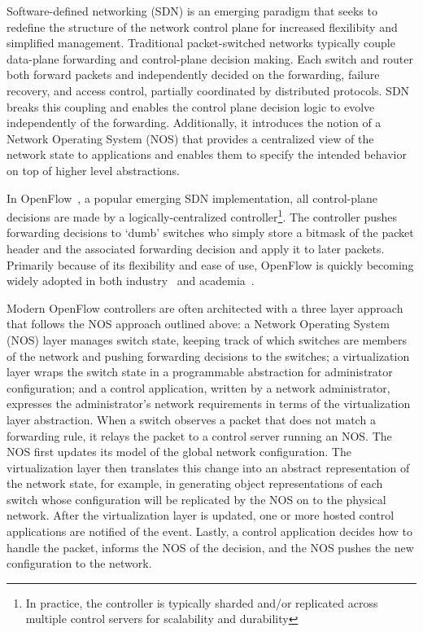 Software-defined networking (SDN) is an emerging paradigm that seeks to redefine
the structure of the network control plane for increased flexilibity and
simplified management. Traditional packet-switched networks typically couple
data-plane forwarding and control-plane decision making. Each switch and router
both forward packets and independently decided on the forwarding, failure
recovery, and access control, partially coordinated by distributed protocols.
SDN breaks this coupling and enables the control plane decision logic to evolve
independently of the forwarding. Additionally, it introduces the notion of a
Network Operating System (NOS) that provides a centralized view of the network
state to applications and enables them to specify the intended behavior on top
of higher level abstractions.

In OpenFlow~\cite{openflow}, a popular emerging SDN implementation, all
control-plane decisions are made by a logically-centralized
controller\footnote{In practice, the controller is typically sharded and/or
replicated across multiple control servers for scalability and durability}. The
controller pushes forwarding decisions to `dumb' switches who simply store a
bitmask of the packet header and the associated forwarding decision and apply it
to later packets. Primarily because of its flexibility and ease of use, OpenFlow
is quickly becoming widely adopted in both industry~\cite{nicirahomepage,
bigswitch} and academia~\cite{nox, pox, ethane}.

Modern OpenFlow controllers are often architected with a three layer approach
that follows the NOS approach outlined above: a Network Operating System (NOS)
layer manages switch state, keeping track of which switches are members of the
network and pushing forwarding decisions to the switches; a virtualization layer
wraps the switch state in a programmable abstraction for administrator
configuration; and a control application, written by a network administrator,
expresses the administrator's network requirements in terms of the
virtualization layer abstraction. When a switch observes a packet that does not
match a forwarding rule, it relays the packet to a control server running an
NOS. The NOS first updates its model of the global network configuration. The
virtualization layer then translates this change into an abstract representation
of the network state, for example, in generating object representations of each
switch whose configuration will be replicated by the NOS on to the physical
network. After the virtualization layer is updated, one or more hosted control
applications are notified of the event. Lastly, a control application decides
how to handle the packet, informs the NOS of the decision, and the NOS pushes
the new configuration to the network. 

